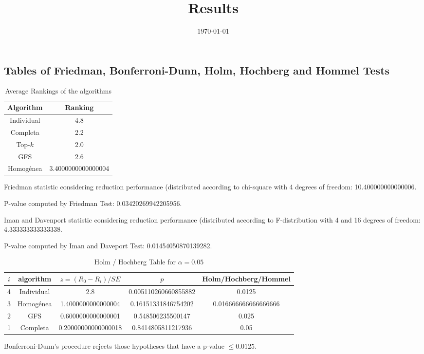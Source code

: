 \documentclass[a4paper,10pt]{article}
\title{Results}
\author{}
\date{\today}
\begin{document}
\begin{landscape}
\oddsidemargin 0in \topmargin 0in\maketitle
\section{Tables of Friedman, Bonferroni-Dunn, Holm, Hochberg and Hommel Tests}
\begin{table}[!htp]
\centering
\caption{Average Rankings of the algorithms
}\begin{tabular}{c|c}
Algorithm&Ranking\\
\hline
Individual&4.8\\
Completa&2.2\\
Top-$k$&2.0\\
GFS&2.6\\
Homogénea&3.4000000000000004\\
\end{tabular}
\end{table}


Friedman statistic considering reduction performance (distributed according to chi-square with 4 degrees of freedom: 10.400000000000006.


P-value computed by Friedman Test: 0.03420269942205956.\newline

Iman and Davenport statistic considering reduction performance (distributed according to F-distribution with 4 and 16 degrees of freedom: 4.333333333333338.


P-value computed by Iman and Daveport Test: 0.01454050870139282.\newline

\begin{table}[!htp]
\centering\tiny
\caption{Holm / Hochberg Table for $\alpha=0.05$}
\begin{tabular}{ccccc}
$i$&algorithm&$z=(R_0 - R_i)/SE$&$p$&Holm/Hochberg/Hommel\\
\hline
4&Individual&2.8&0.005110260660855882&0.0125\\
3&Homogénea&1.4000000000000004&0.16151331846754202&0.016666666666666666\\
2&GFS&0.6000000000000001&0.548506235500147&0.025\\
1&Completa&0.20000000000000018&0.8414805811217936&0.05\\
\hline
\end{tabular}
\end{table}
Bonferroni-Dunn's procedure rejects those hypotheses that have a p-value $\le0.0125$.



\end{landscape}
\end{document}
